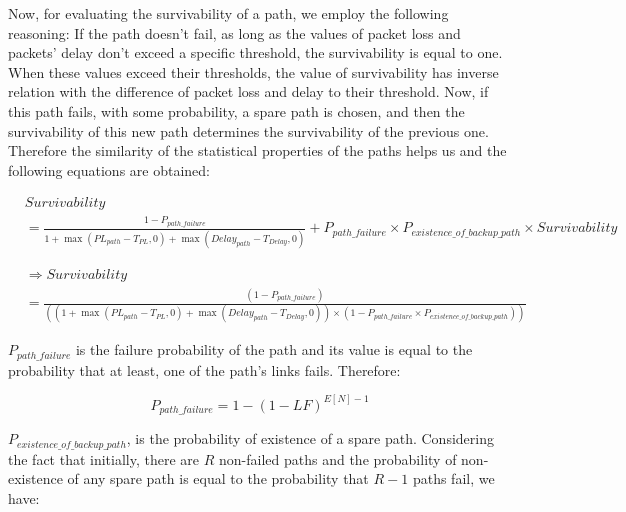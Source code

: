 \documentclass[onecolumn,conference]{IEEEtran}
\begin{document}
    Now, for evaluating the survivability of a path, we employ the following reasoning:
    If the path doesn't fail, as long as the values of packet loss and packets' delay don't exceed a specific threshold, the survivability is equal to one. When these values exceed their thresholds, the value of survivability has inverse relation with the difference of packet loss and delay to their threshold. Now, if this path fails, with some probability, a spare path is chosen, and then the survivability of this new path determines the survivability of the previous one. Therefore the similarity of the statistical properties of the paths helps us and the following equations are obtained:

    \begin{equation}
        \begin{split}
            &Survivability\\&=\frac{1-P_{path\_failure}}{1+\max\left(PL_{path}-T_{PL},0\right)+\max\left(Delay_{path}-T_{Delay},0\right)}+P_{path\_failure}\times P_{existence\_of\_backup\_path}\times
            Survivability
        \end{split}
    \end{equation}

    \begin{equation}
        \begin{split}
            &\Rightarrow Survivability
            \\&=\frac{\left( 1-P_{path\_failure} \right)}
            {\left(
            \left(1+\max\left(PL_{path}-T_{PL},0\right)+\max\left(Delay_{path}-T_{Delay},0 \right)\right)
            \times
            \left(1- P_{path\_failure}\times P_{existence\_of\_backup\_path} \right)
            \right)}
        \end{split}
    \end{equation}

    $P_{path\_failure}$ is the failure probability of the path and its value is equal to the probability that at least, one of the path's links fails. Therefore:

    \begin{equation}
        P_{path\_failure}=1-\left( 1-LF \right)^{E\left[ N \right]-1}
    \end{equation}

    $P_{existence\_of\_backup\_path}$, is the probability of existence of a spare path. Considering the fact that initially, there are $R$ non-failed paths and the probability of non-existence of any spare path is equal to the probability that $R-1$ paths fail, we have:
\end{document}
